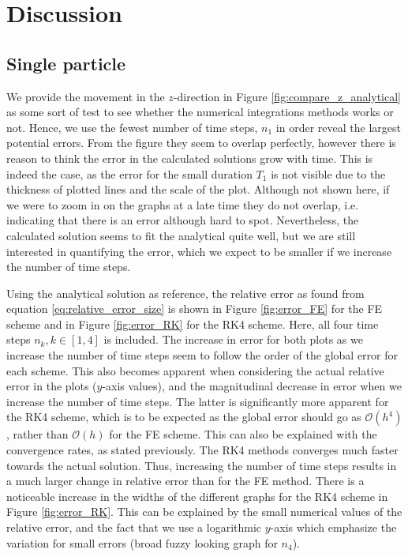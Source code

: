 \section{Discussion}\label{sec:discussion}

\subsection{Single particle}

We provide the movement in the $z$-direction in Figure \ref{fig:compare_z_analytical} as some sort of test to see whether the numerical integrations methods works or not. Hence, we use the fewest number of time steps, $n_1$ in order reveal the largest potential errors. From the figure they seem to overlap perfectly, however there is reason to think the error in the calculated solutions grow with time. This is indeed the case, as the error for the small duration $T_1$ is not visible due to the thickness of plotted lines and the scale of the plot. Although not shown here, if we were to zoom in on the graphs at a late time they do not overlap, i.e. indicating that there is an error although hard to spot. Nevertheless, the calculated solution seems to fit the analytical quite well, but we are still interested in quantifying the error, which we expect to be smaller if we increase the number of time steps. 

Using the analytical solution as reference, the relative error as found from equation \ref{eq:relative_error_size} is shown in Figure \ref{fig:error_FE} for the FE scheme and in Figure \ref{fig:error_RK} for the RK4 scheme. Here, all four time steps $n_k, k\in[1,4]$ is included. The increase in error for both plots as we increase the number of time steps seem to follow the order of the global error for each scheme. This also becomes apparent when considering the actual relative error in the plots ($y$-axis values), and the magnitudinal decrease in error when we increase the number of time steps. The latter is significantly more apparent for the RK4 scheme, which is to be expected as the global error should go as $\mathcal{O}(h^4)$, rather than $\mathcal{O}(h)$ for the FE scheme. This can also be explained with the convergence rates, as stated previously. The RK4 methods converges much faster towards the actual solution. Thus, increasing the number of time steps results in a much larger change in relative error than for the FE method. There is a noticeable increase in the widths of the different graphs for the RK4 scheme in Figure \ref{fig:error_RK}. This can be explained by the small numerical values of the relative error, and the fact that we use a logarithmic $y$-axis which emphasize the variation for small errors (broad fuzzy looking graph for $n_4$). 


